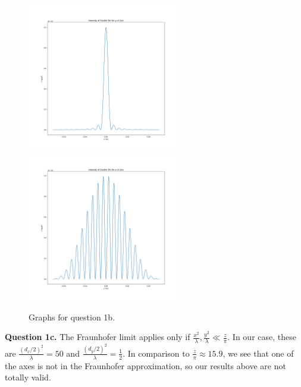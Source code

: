 \documentclass[letterpaper, reqno,11pt]{article}
\begin{document}
\begin{figure}[htpb]
    \centering
    \includegraphics[width=0.6\textwidth]{q1x}
    \includegraphics[width=0.6\textwidth]{q1y}
    \caption{Graphs for question 1b.}
    \label{fig:q1b}
\end{figure}

{\medskip\noindent\bf Question 1c.} The Fraunhofer limit applies only if $\frac{x^2}{\lambda}, \frac{y^2}{\lambda} \ll \frac{z}{\pi}$. In our case, these are $\frac{(d_x/2)^2}{\lambda}=50$ and $\frac{(d_y /2)^2}{\lambda}=\frac{1}{2}$. In comparison to $\frac{z}{\pi}\approx 15.9$, we see that one of the axes is not in the Fraunhofer approximation, so our results above are not totally valid.
\end{document}
